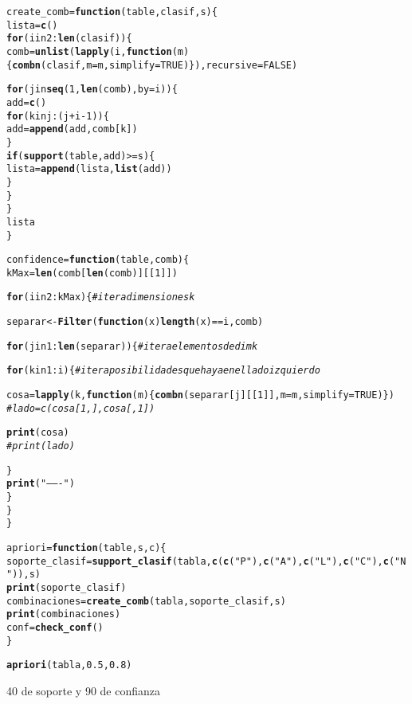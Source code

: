 \documentclass[12pt]{report}\usepackage[]{graphicx}\usepackage[dvipsnames]{xcolor}
\makeatletter
\newcommand{\hlstr}[1]{\textcolor[rgb]{0.192,0.494,0.8}{#1}}%
\newcommand{\hlcom}[1]{\textcolor[rgb]{0.678,0.584,0.686}{\textit{#1}}}%
\newcommand{\hlkwd}[1]{\textcolor[rgb]{0.737,0.353,0.396}{\textbf{#1}}}%
\newenvironment{kframe}{%
 \def\at@end@of@kframe{}%
 \ifinner\ifhmode%
  \def\at@end@of@kframe{\end{minipage}}%
  \begin{minipage}{\columnwidth}%
 \fi\fi%
 \def\FrameCommand##1{\hskip\@totalleftmargin \hskip-\fboxsep
 \colorbox{shadecolor}{##1}\hskip-\fboxsep
     \hskip-\linewidth \hskip-\@totalleftmargin \hskip\columnwidth}%
 \MakeFramed {\advance\hsize-\width
   \@totalleftmargin\z@ \linewidth\hsize
   \@setminipage}}%
 {\par\unskip\endMakeFramed%
 \at@end@of@kframe}
\newenvironment{knitrout}{}{} %
\makeatother
\begin{document}
\begin{knitrout}
\begin{kframe}
\begin{alltt}
create_comb = \hlkwd{function}(table, clasif, s) \{
	lista = \hlkwd{c}()
	\hlkwd{for} (i in 2:\hlkwd{len}(clasif)) \{
		comb = \hlkwd{unlist}(\hlkwd{lapply}(i, \hlkwd{function}(m) \{\hlkwd{combn}(clasif, m=m, simplify=TRUE)\}), recursive=FALSE)
		
		\hlkwd{for} (j in \hlkwd{seq}(1, \hlkwd{len}(comb), by=i)) \{
			add = \hlkwd{c}()
			\hlkwd{for} (k in j:(j+i-1)) \{
				add = \hlkwd{append}(add, comb[k])
			\}
			\hlkwd{if} (\hlkwd{support}(table, add) >= s) \{
				lista = \hlkwd{append}(lista, \hlkwd{list}(add))
			\}
		\}
	\}
	lista
\}

confidence = \hlkwd{function}(table, comb) \{
	kMax = \hlkwd{len}(comb[\hlkwd{len}(comb)][[1]])
	
	\hlkwd{for} (i in 2:kMax) \{ \hlcom{#itera dimensiones k}
	
		separar <- \hlkwd{Filter}(\hlkwd{function}(x) \hlkwd{length}(x)==i, comb)
		
		\hlkwd{for} (j in 1:\hlkwd{len}(separar)) \{ \hlcom{#itera elementos de dim k}
			
			\hlkwd{for} (k in 1:i) \{ \hlcom{#itera posibilidades que haya en el lado izquierdo}
			
				cosa = \hlkwd{lapply}(k, \hlkwd{function}(m) \{\hlkwd{combn}(separar[j][[1]], m=m, simplify=TRUE)\})
\hlcom{				#lado = c(cosa[1,], cosa[,1])}
				
				\hlkwd{print}(cosa)
\hlcom{				#print(lado)}
			
			\}
			\hlkwd{print}(\hlstr{"-------"})
		\}
	\}
\}

apriori = \hlkwd{function}(table, s, c) \{
	soporte_clasif = \hlkwd{support_clasif}(tabla, \hlkwd{c}(\hlkwd{c}(\hlstr{"P"}), \hlkwd{c}(\hlstr{"A"}) ,\hlkwd{c}(\hlstr{"L"}), \hlkwd{c}(\hlstr{"C"}), \hlkwd{c}(\hlstr{"N"})), s)
	\hlkwd{print}(soporte_clasif)
	combinaciones = \hlkwd{create_comb}(tabla, soporte_clasif, s)
	\hlkwd{print}(combinaciones)
	conf = \hlkwd{check_conf}()
\}


\hlkwd{apriori}(tabla, 0.5, 0.8)



\end{alltt}


{\ttfamily\noindent\bfseries{}}\end{kframe}
\end{knitrout}


40 de soporte y 90 de confianza
\end{document}
